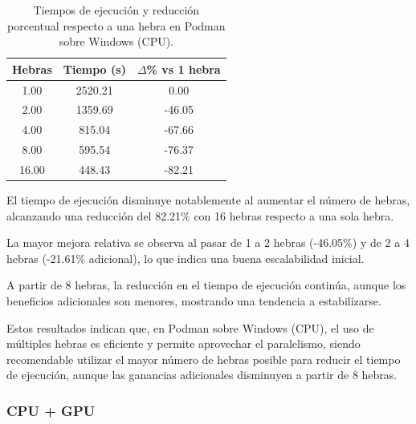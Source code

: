 \begin{table}[ht]
    \centering
    \begin{tabular}{|c|c|c|}
        \hline
        \textbf{Hebras} & \textbf{Tiempo (s)} & \textbf{$\Delta$\% vs 1 hebra} \\
        \hline
        1.00            & 2520.21             & 0.00                           \\
        2.00            & 1359.69             & -46.05                         \\
        4.00            & 815.04              & -67.66                         \\
        8.00            & 595.54              & -76.37                         \\
        16.00           & 448.43              & -82.21                         \\
        \hline
    \end{tabular}
    \caption{Tiempos de ejecución y reducción porcentual respecto a una hebra en Podman sobre Windows (CPU).}
    \label{tab:single-node_windows_podman_time}
\end{table}

El tiempo de ejecución disminuye notablemente al aumentar el número de hebras, alcanzando una reducción del 82.21\% con 16 hebras respecto a una sola hebra.

La mayor mejora relativa se observa al pasar de 1 a 2 hebras (-46.05\%) y de 2 a 4 hebras (-21.61\% adicional), lo que indica una buena escalabilidad inicial.

A partir de 8 hebras, la reducción en el tiempo de ejecución continúa, aunque los beneficios adicionales son menores, mostrando una tendencia a estabilizarse.

Estos resultados indican que, en Podman sobre Windows (CPU), el uso de múltiples hebras es eficiente y permite aprovechar el paralelismo, siendo recomendable utilizar el mayor número de hebras posible para reducir el tiempo de ejecución, aunque las ganancias adicionales disminuyen a partir de 8 hebras.

\subsubsection{CPU + GPU}


